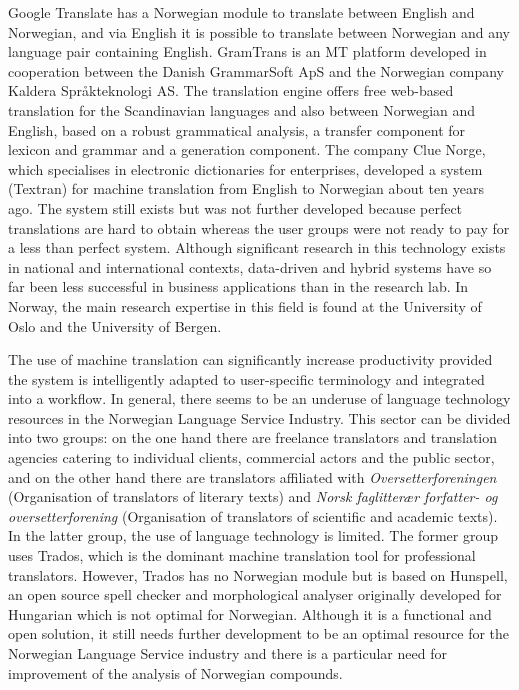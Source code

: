 \begin{multicols}{2}
Google Translate has a Norwegian module to translate between English and Norwegian, and via English it is possible to translate between Norwegian and any language pair containing English. 
GramTrans is an MT platform developed in cooperation between the Danish GrammarSoft ApS and the Norwegian company Kaldera Språkteknologi AS. 
The translation engine offers free web-based translation for the Scandinavian languages and also between Norwegian and English, based on a robust grammatical analysis, a transfer component for lexicon and grammar and a generation component. 
The company Clue Norge, which specialises in electronic dictionaries for enterprises, developed a system (Textran) for machine translation from English to Norwegian about ten years ago. 
The system still exists but was not further developed because perfect translations are hard to obtain whereas the user groups were not ready to pay for a less than perfect system.
Although significant research in this technology exists in national and international contexts, data-driven and hybrid systems have so far been less successful in business applications than in the research lab. 
In Norway, the main research expertise in this field is found at the University of Oslo and the University of Bergen.


The use of machine translation can significantly increase productivity provided the system is intelligently adapted to user-specific terminology and integrated into a workflow. 
In general, there seems to be an underuse of language technology resources in the Norwegian Language Service Industry. 
This sector can be divided into two groups: on the one hand there are freelance translators and translation agencies catering to individual clients, commercial actors and the public sector, and on the other hand there are translators affiliated with \textit{Oversetterforeningen} (Organisation of translators of literary texts) and \textit{Norsk faglitterær forfatter- og oversetterforening} (Organisation of translators of scientific and academic texts). In the latter group, the use of language technology is limited. 
The former group uses Trados, which is the dominant machine translation tool for professional translators. 
However, Trados has no Norwegian module but is based on Hunspell, an open source spell checker and morphological analyser originally developed for Hungarian which is not optimal for Norwegian. 
Although it is a functional and open solution, it still needs further development to be an optimal resource for the Norwegian Language Service industry and there is a particular need for improvement of the analysis of Norwegian compounds. 


\end{multicols}
